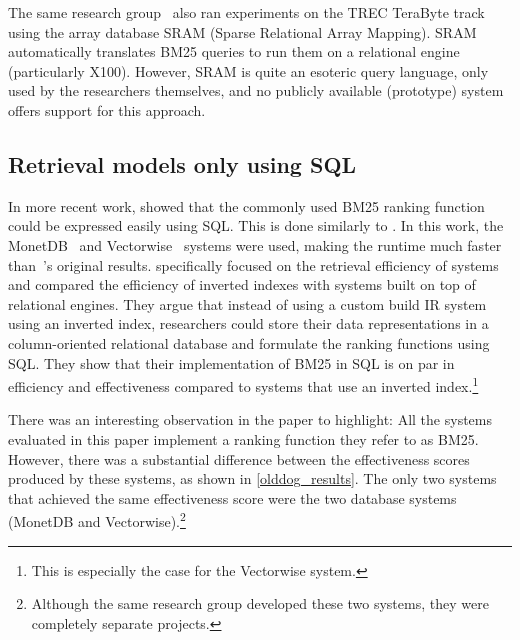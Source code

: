 The same research group~\citep{array-db} also ran experiments on the TREC TeraByte track using the array database SRAM (Sparse Relational Array Mapping). SRAM automatically translates BM25 queries to run them on a relational engine (particularly X100). However, SRAM is quite an esoteric query language, only used by the researchers themselves, and no publicly available (prototype) system offers support for this approach. 

\subsection{Retrieval models only using SQL}
In more recent work, \citet{OldDog} showed that the commonly used BM25 ranking function could be expressed easily using SQL. This is done similarly to \citet{PowerDB-IR}. In this work, the MonetDB~\citep{monet} and Vectorwise~\citep{vectorwise} systems were used, making the runtime much faster than~\citeauthor{PowerDB-IR}'s original results.  specifically focused on the retrieval efficiency of systems and compared the efficiency of inverted indexes with systems built on top of relational engines. They argue that instead of using a custom build IR system using an inverted index, researchers could store their data representations in a column-oriented relational database and formulate the ranking functions using SQL. They show that their implementation of BM25 in SQL is on par in efficiency and effectiveness compared to systems that use an inverted index.\footnote{This is especially the case for the Vectorwise system.}  

There was an interesting observation in the paper to highlight: All the systems evaluated in this paper implement a ranking function they refer to as BM25. However, there was a substantial difference between the effectiveness scores produced by these systems, as shown in \cref{olddog_results}. The only two systems that achieved the same effectiveness score were the two database systems (MonetDB and Vectorwise).\footnote{Although the same research group developed these two systems, they were completely separate projects.}

